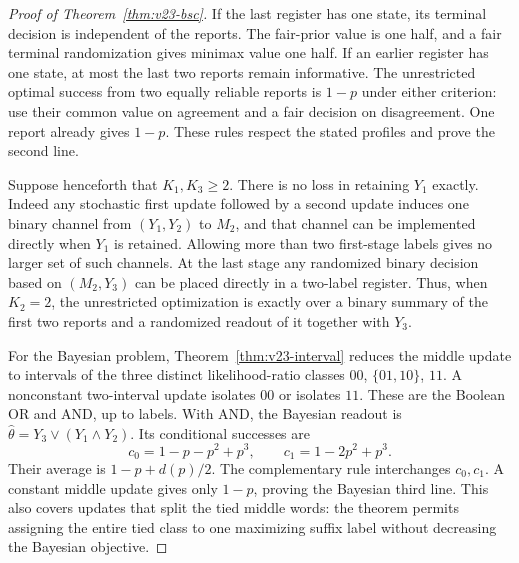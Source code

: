 \begin{proof}[Proof of Theorem~\ref{thm:v23-bsc}]
If the last register has one state, its terminal decision is independent
of the reports. The fair-prior value is one half, and a fair terminal
randomization gives minimax value one half. If an earlier register has
one state, at most the last two reports remain informative. The
unrestricted optimal success from two equally reliable reports is
$1-p$ under either criterion: use their common value on agreement and
a fair decision on disagreement. One report already gives $1-p$.
These rules respect the stated profiles and prove the second line.

Suppose henceforth that $K_1,K_3\ge2$. There is no loss in retaining
$Y_1$ exactly. Indeed any stochastic first update followed by a second
update induces one binary channel from $(Y_1,Y_2)$ to $M_2$, and that
channel can be implemented directly when $Y_1$ is retained. Allowing
more than two first-stage labels gives no larger set of such channels.
At the last stage any randomized binary decision based on $(M_2,Y_3)$
can be placed directly in a two-label register. Thus, when $K_2=2$,
the unrestricted optimization is exactly over a binary summary of the
first two reports and a randomized readout of it together with $Y_3$.

For the Bayesian problem, Theorem~\ref{thm:v23-interval} reduces the
middle update to intervals of the three distinct likelihood-ratio
classes $00$, $\{01,10\}$, $11$. A nonconstant two-interval update
isolates $00$ or isolates $11$. These are the Boolean OR and AND,
up to labels. With AND, the Bayesian readout is
$\widehat\theta=Y_3\lor(Y_1\land Y_2)$. Its conditional successes are
\[
 c_0=1-p-p^2+p^3,\qquad c_1=1-2p^2+p^3.
\]
Their average is $1-p+d(p)/2$. The complementary rule interchanges
$c_0,c_1$. A constant middle update gives only $1-p$, proving the
Bayesian third line. This also covers updates that split the tied
middle words: the theorem permits assigning the entire tied class to
one maximizing suffix label without decreasing the Bayesian objective.


\end{proof}
